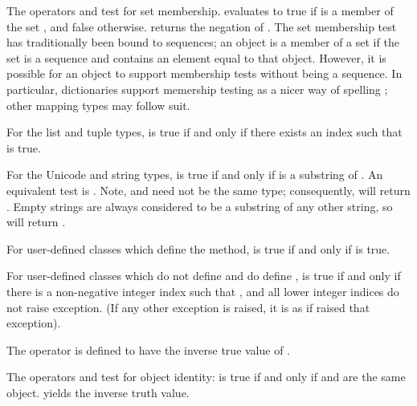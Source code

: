 The operators  and  test for set
membership.   evaluates to true if 
is a member of the set , and false otherwise.   returns the negation of .
The set membership test has traditionally been bound to sequences; an
object is a member of a set if the set is a sequence and contains an
element equal to that object.  However, it is possible for an object
to support membership tests without being a sequence.  In particular,
dictionaries support memership testing as a nicer way of spelling
; other mapping types may follow suit.

For the list and tuple types,  is true if and
only if there exists an index  such that
 is true.

For the Unicode and string types,  is true if
and only if  is a substring of .  An equivalent test is
.  Note,  and  need not be the
same type; consequently,  will return .
Empty strings are always considered to be a substring of any other string,
so  will return .

For user-defined classes which define the  method,
 is true if and only if
 is true.

For user-defined classes which do not define  and
do define ,  is true if
and only if there is a non-negative integer index  such that
, and all lower integer indices
do not raise  exception. (If any other exception
is raised, it is as if  raised that exception).

The operator  is defined to have the inverse true value
of .

The operators  and  test for object identity:
 is true if and only if  and 
are the same object.   yields the inverse
truth value.


